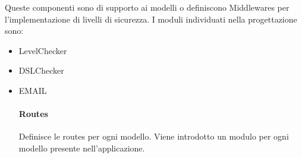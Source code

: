 Queste componenti sono di supporto ai modelli o definiscono Middlewares per l'implementazione di livelli di sicurezza.
I moduli individuati nella progettazione sono:
\begin{itemize}
\item LevelChecker      
\item DSLChecker        
\item EMAIL             %

\paragraph*{Routes}

Definisce le routes per ogni modello. Viene introdotto un modulo per ogni modello presente nell'applicazione.



\end{itemize}
